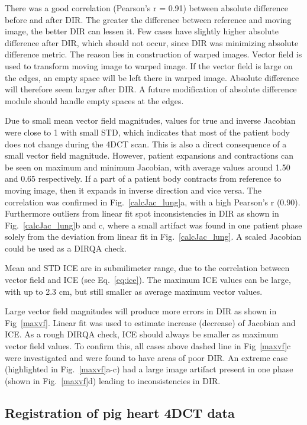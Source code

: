 \documentclass[type=dr, dr=rernat, accentcolor=tud7b,colorbacktitle, bigchapter, openright, twoside, 12pt ]{tudthesis}
\begin{document}
There was a good correlation (Pearson's r = 0.91) between absolute difference before and after DIR. The greater the difference between reference and moving image, the better DIR can lessen it. Few cases
have slightly higher absolute difference after DIR, which should not occur, since DIR was minimizing absolute difference metric. The reason lies in construction of warped images. Vector field is used to transform
moving image to warped image. If the vector field is large on the edges, an empty space will be left there in warped image. Absolute difference will therefore seem larger after DIR. A future modification of absolute difference
module should handle empty spaces at the edges.

Due to small mean vector field magnitudes, values for true and inverse Jacobian were close to 1 with small STD, which indicates that most of the patient body does not change during the 4DCT scan. This is also a direct consequence of a small vector field magnitude.
However, patient expansions and contractions can be seen on maximum and minimum Jacobian, with average values around 1.50 and 0.65 respectively. If a part of a patient body contracts from reference to moving image, 
then it expands in inverse direction and vice versa. The correlation was confirmed in Fig.~\ref{calcJac_lung}a, with a high Pearson's r (0.90). Furthermore outliers from linear fit spot inconsistencies
in DIR as shown in Fig.~\ref{calcJac_lung}b and c, where a small artifact was found in one patient phase solely from the deviation from linear fit in Fig.~\ref{calcJac_lung}. A scaled Jacobian could be used as a DIRQA check.

Mean and STD ICE are in submilimeter range, due to the correlation between vector field and ICE (see Eq.~\ref{eq:ice}). The maximum ICE values can be large, with up to 2.3 cm, 
but still smaller as average maximum vector values. 

Large vector field magnitudes will produce more errors in DIR as shown in Fig~\ref{maxvf}. Linear fit was used to estimate increase (decrease) of Jacobian and ICE. As a rough DIRQA check, ICE
should always be smaller as maximum vector field values. To confirm this, all cases above dashed line in Fig~\ref{maxvf}c were investigated and were found to have areas of poor DIR. An extreme case (highlighted in Fig.~\ref{maxvf}a-c)
had a large image artifact present in one phase (shown in Fig.~\ref{maxvf}d) leading to inconsistencies in DIR.


\newpage
\subsection{Registration of pig heart 4DCT data}
\end{document}

